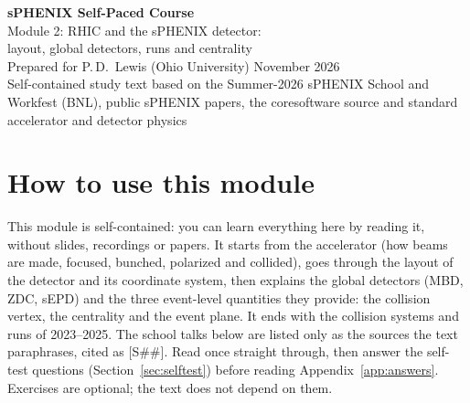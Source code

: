 \documentclass[11pt,letterpaper]{article}
\begin{document}
\begin{center}
{\LARGE\bfseries sPHENIX Self-Paced Course}\\[4pt]
{\Large Module 2: RHIC and the sPHENIX detector:\\ layout, global detectors, runs and centrality}\\[8pt]
Prepared for P.\,D.\ Lewis (Ohio University) \quad November 2026\\[2pt]
\small Self-contained study text based on the Summer-2026 sPHENIX School and Workfest (BNL), public sPHENIX papers, the coresoftware source and standard accelerator and detector physics
\end{center}

\tableofcontents
\newpage

\section*{How to use this module}
This module is self-contained: you can learn everything here by reading it, without slides, recordings or papers.
It starts from the accelerator (how beams are made, focused, bunched, polarized and collided), goes through the layout of
the detector and its coordinate system, then explains the global detectors (MBD, ZDC, sEPD) and the three event-level
quantities they provide: the collision vertex, the centrality and the event plane. It ends with the collision systems
and runs of 2023--2025. The school talks below are listed only as the sources the text paraphrases, cited as [S\#\#].
Read once straight through, then answer the self-test questions (Section~\ref{sec:selftest}) before reading
Appendix~\ref{app:answers}. Exercises are optional; the text does not depend on them.
\end{document}
